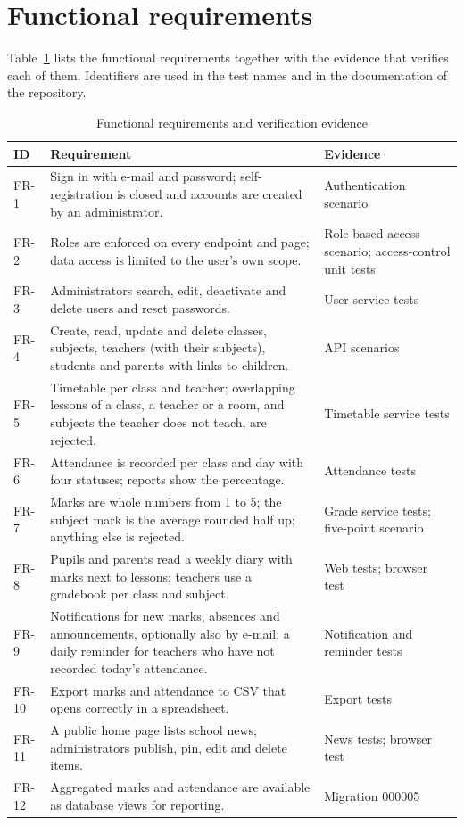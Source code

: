 \section{Functional requirements}

Table~\ref{tab:fr} lists the functional requirements together with the evidence that verifies each of them. Identifiers are used in the test names and in the documentation of the repository.

\begin{table}[H]
\centering
\caption{Functional requirements and verification evidence}
\label{tab:fr}
\small
\begin{tabularx}{\textwidth}{@{}l>{\raggedright\arraybackslash}X>{\raggedright\arraybackslash}p{4.1cm}@{}}
\toprule
ID & Requirement & Evidence \\
\midrule
FR-1 & Sign in with e-mail and password; self-registration is closed and accounts are created by an administrator. & Authentication scenario \\
FR-2 & Roles are enforced on every endpoint and page; data access is limited to the user's own scope. & Role-based access scenario; access-control unit tests \\
FR-3 & Administrators search, edit, deactivate and delete users and reset passwords. & User service tests \\
FR-4 & Create, read, update and delete classes, subjects, teachers (with their subjects), students and parents with links to children. & API scenarios \\
FR-5 & Timetable per class and teacher; overlapping lessons of a class, a teacher or a room, and subjects the teacher does not teach, are rejected. & Timetable service tests \\
FR-6 & Attendance is recorded per class and day with four statuses; reports show the percentage. & Attendance tests \\
FR-7 & Marks are whole numbers from 1 to 5; the subject mark is the average rounded half up; anything else is rejected. & Grade service tests; five-point scenario \\
FR-8 & Pupils and parents read a weekly diary with marks next to lessons; teachers use a gradebook per class and subject. & Web tests; browser test \\
FR-9 & Notifications for new marks, absences and announcements, optionally also by e-mail; a daily reminder for teachers who have not recorded today's attendance. & Notification and reminder tests \\
FR-10 & Export marks and attendance to CSV that opens correctly in a spreadsheet. & Export tests \\
FR-11 & A public home page lists school news; administrators publish, pin, edit and delete items. & News tests; browser test \\
FR-12 & Aggregated marks and attendance are available as database views for reporting. & Migration 000005 \\
\bottomrule
\end{tabularx}
\end{table}

